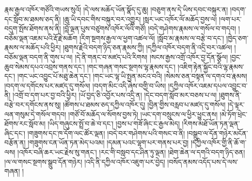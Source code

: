རྣམ་རྒྱལ་འཁོར་གཙོའི་གཡས་སུའོ། །དེ་ལས་མཆོད་ཡོན་སྣོད་དུ་ཆུ། །བཅུག་ནས་དེ་ཡིས་དབང་བསྐུར་ན། །བདག་དང་སློབ་མ་ཐམས་ཅད་ནི། །ཆུ་ཡི་དབང་གིས་བསྐུར་བར་འགྱུར། །སླར་ཡང་འཁོར་ལོ་མཆོད་བྱས་ལ། །ལག་པར་བདུག་སྤོས་ཐོགས་ནས་ནི། །བློ་ལྡན་པུས་བཙུགས་འཁོར་ལོའི་གཙོ། །བདེ་གཤེགས་རྣམས་ལ་གསོལ་བ་གདབ། །བཅོམ་ལྡན་འཇམ་པའི་རྡོ་རྗེ་མཆོག །རིག་སྔགས་རྒྱལ་ལ་ཕྱག་འཚལ་ལོ། །སློབ་མ་རྣམས་ལ་བརྩེ་བ་དང་། །ཁྱེད་ཅག་རྣམས་ལ་མཆོད་པའི་ཕྱིར། །ཐུགས་རྗེའི་བདག་ཉིད་ཅན་རྣམས་ཀྱི། །དཀྱིལ་འཁོར་བདག་ནི་འདྲི་བར་འཚལ། །བཅོམ་ལྡན་བདག་ནི་གུས་པ་ལ། །དེ་ནི་གནང་བ་མཛད་པའི་རིགས། །སངས་རྒྱས་འགྲོ་འཁོར་བྱ་དོན་སྩོལ། །བྱང་ཆུབ་སེམས་དཔའ་འབྲས་གནས་དང་། །གང་གཞན་གསང་སྔགས་ལྷ་རྣམས་དང་། །འཇིག་རྟེན་སྐྱོང་བའི་ལྷ་རྣམས་དང་། །གང་ཡང་འབྱུང་པོ་མཐུ་ཆེན་དང་། །གང་ཡང་ལྷ་ཡི་སྤྱན་མངའ་བའི། །སེམས་ཅན་བསྟན་ལ་དགའ་བ་རྣམས། །བདག་ལ་དགོངས་པར་མཛད་དུ་གསོལ། །བདག་མིང་འདི་ཞེས་བགྱི་བ་ཡིས། །དཀྱིལ་འཁོར་འཇམ་དཔལ་འབྱུང་བ་ནི། །འགྲོ་བ་དག་པར་བྱ་བའི་ཕྱིར། །ཡོ་བྱད་ཅི་འབྱོར་པས་འདྲི་ན། །དེང་བདག་སློབ་མར་བཅས་པ་ལ། །ཐུགས་ནི་བརྩེ་བར་དགོངས་ནས་སུ། །ཚོགས་པ་ཐམས་ཅད་དཀྱིལ་འཁོར་དུ། །བྱིན་གྱིས་བརླབ་པ་མཛད་དུ་གསོལ། །དེ་ལྟར་ལན་གསུམ་དེ་གསོལ་གདབ། །གཙོ་བོ་མཆོད་ལ་སོགས་བྱས་ཏེ། །ཡང་དག་བསྲུངས་ལ་ཕྱིར་ཕྱུང་ནས། །མེ་ཏོག་ཕྲེང་ཐོགས་རང་སློབ་མ། །ཡིད་གཞུངས་སྤྲོ་བ་ཆེ་བ་དང་། །བྱས་པ་གཟོ་ཞིང་ང་རྒྱལ་མེད། །རིགས་མཐོ་ཡོན་ཏན་ལྡན་ཞིང་དང་། །གཟུགས་དང་ཁ་དོག་ལང་ཚོར་ལྡན། །བདེ་བར་གཤེགས་པའི་གསང་བ་ནི། །བསྒྲུབ་ལ་དོན་གཉེར་མངོན་བརྩོན་ན། །གཟུགས་ངན་ཡོན་ཏན་མེད་པའམ། །དམན་པའང་ལྷག་པར་གནས་པར་བྱ། །དཀྱིལ་འཁོར་གྱི་ནི་ཆོ་ག་ལས། །འཁོར་བཞི་ཆར་ཡང་རྗེས་སུ་གནང་། །རང་གི་བསླབ་དང་ཤིན་ཏུ་ལྡན། །ཐེག་ཆེན་ལ་དགའི་བདག་ཉིད་ཅན། །ལ་ལ་གསང་སྔགས་སྒྲུབ་དོན་གཉེར། །འདི་ནི་དཀྱིལ་འཁོར་འཇུག་པར་བྱེད། །བསོད་ནམས་འདོད་པས་དེ་ལས་གཞན། །
